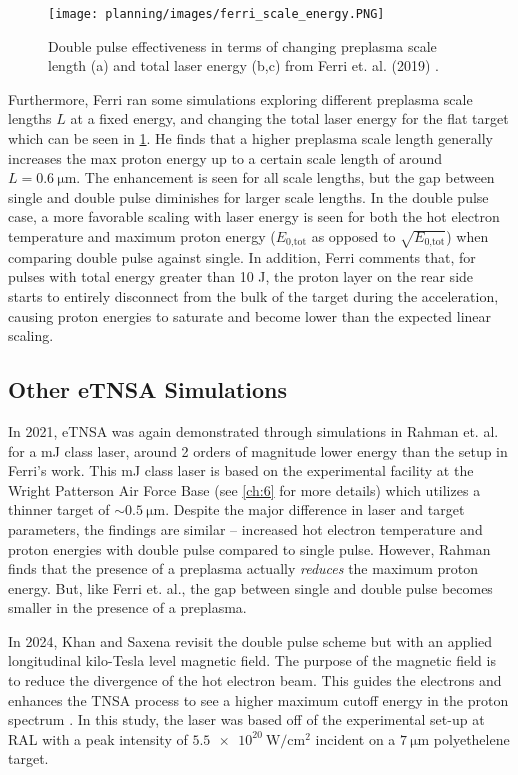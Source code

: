\begin{figure}
	\centering 
	\texttt{[image: planning/images/ferri\_scale\_energy.PNG]}
	\caption{Double pulse effectiveness in terms of changing preplasma scale length (a) and total laser energy (b,c) from Ferri et. al. (2019) \cite{Ferri_2019_Nat_Comm}.}
	\label{fig:ferri_scale_energy}
\end{figure}

Furthermore, Ferri ran some simulations exploring different preplasma scale lengths $L$ at a fixed energy, and changing the total laser energy for the flat target \cite{Ferri_2019_Nat_Comm} which can be seen in \cref{fig:ferri_scale_energy}. He finds that a higher preplasma scale length generally increases the max proton energy up to a certain scale length of around $L = \SI{0.6}{\micro \meter}$. The enhancement is seen for all scale lengths, but the gap between single and double pulse diminishes for larger scale lengths. In the double pulse case, a more favorable scaling with laser energy is seen for both the hot electron temperature and maximum proton energy ($E_\text{0,tot}$ as opposed to $\sqrt{E_\text{0,tot}}$) when comparing double pulse against single. In addition, Ferri comments that, for pulses with total energy greater than 10 J, the proton layer on the rear side starts to entirely disconnect from the bulk of the target during the acceleration, causing proton energies to saturate and become lower than the expected linear scaling.

\subsection{Other eTNSA Simulations}
In 2021, \gls{eTNSA} was again demonstrated through simulations in Rahman et. al. \cite{Rahman_2021_PoP} for a mJ class laser, around 2 orders of magnitude lower energy than the setup in Ferri's work. This mJ class laser is based on the experimental facility at the Wright Patterson Air Force Base (see \cref{ch:6} for more details) which utilizes a thinner target of $\sim \SI{0.5}{\micro \meter}$. Despite the major difference in laser and target parameters, the findings are similar -- increased hot electron temperature and proton energies with double pulse compared to single pulse. However, Rahman finds that the presence of a preplasma actually \emph{reduces} the maximum proton energy. But, like Ferri et. al., the gap between single and double pulse becomes smaller in the presence of a preplasma.

In 2024, Khan and Saxena \cite{Khan_2024_NJoP} revisit the double pulse scheme but with an applied longitudinal kilo-Tesla level magnetic field. The purpose of the magnetic field is to reduce the divergence of the hot electron beam. This guides the electrons and enhances the \gls{TNSA} process to see a higher maximum cutoff energy in the proton spectrum \cite{Arefiev_2016_NJoP}. In this study, the laser was based off of the experimental set-up at \gls{RAL} with a peak intensity of $\SI{5.5e20}{\watt \per \centi \meter \squared}$ incident on a $\SI{7}{\micro \meter}$ polyethelene target. 

